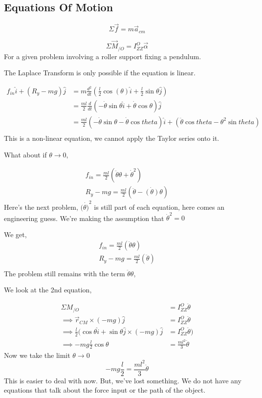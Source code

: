 \documentclass{report}
\begin{document}
\subsection{Equations Of Motion}
\[\Sigma \vec{f} = m \vec{a}_{cm}\] 

\[ \Sigma \vec{M}_{/O} = I_{ZZ}^O \vec{\alpha}\]
For a given problem involving a roller support fixing a pendulum.

\begin{note}
The Laplace Transform is only possible if the equation is linear.
\end{note}
\begin{align*}
	f_{in} \hat{i} + (R_y - mg)\hat{j} &= m \frac{d^2}{dt} (\frac{l}{2} \cos(\theta) \hat{i}  + \frac{l}{2} \sin{\theta} \hat{j}) \\
					   &= \frac{ml}{2} \frac{d}{dt}(-\dot{\theta} \sin{\theta} \hat{i} + \dot{\theta} \cos{\theta})\hat{j} \\
					   &= \frac{ml}{2}(-\dot{\theta} \sin{\theta}-\dot{\theta} \cos{theta})\hat{i} + (\ddot{\theta} \cos{theta} - \theta^2 \sin{theta}) \\
\end{align*}
This is a non-linear equation, we cannot apply the Taylor series onto it.

What about if $\theta \rightarrow 0$,

\begin{align*}
	f_{in} = \frac{ml}{2}(\ddot{\theta} \theta + \dot{\theta}^2) \\
	R_y - mg = \frac{ml}{2}(\ddot{\theta} - \dot{(\theta)}\theta)
\end{align*} 
Here's the next problem, $(\dot{\theta)}^2$ is still part of each equation, here comes an engineering guess. We're making the assumption that $\dot{\theta}^2 = 0$

We get,
\begin{align*}
	f_{in} = \frac{ml}{2}(\ddot{\theta} \theta) \\
	R_y - mg = \frac{ml}{2}(\ddot{\theta})  \\ 
\end{align*}
The problem still remains with the term $\ddot{\theta} \theta$,

We look at the 2nd equation,

\begin{align*}
	\Sigma M_{/O} &= I_{ZZ}^O \ddot{\theta} \\
	\implies \vec{r}_{CM} \times (-mg)\hat{j} &= I_{ZZ}^{O} \ddot{\theta} \\
	\implies \frac{l}{2} (\cos{\theta}\hat{i} + \sin{\theta} \hat{j} \times (-mg)\hat{j} &= I_{ZZ}^O \ddot{\theta}) \\
	\implies -mg \frac{l}{2} \cos{\theta} &= \frac{ml^2}{3} \ddot{\theta}
\end{align*}
Now we take the limit $\theta \rightarrow 0$
\[-mg \frac{l}{2} = \frac{ml^2}{3} \ddot{\theta}\]
This is easier to deal with now.
But, we've lost something. We do not have any equations that talk about the force input or the path of the object.
\end{document}
